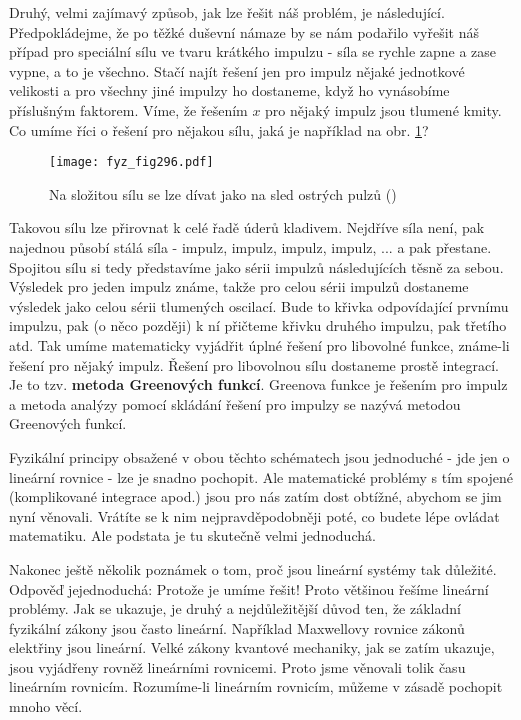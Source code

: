     Druhý, velmi zajímavý způsob, jak lze řešit náš problém, je následující. Předpokládejme, že po 
    těžké duševní námaze by se nám podařilo vyřešit náš případ pro speciální sílu ve tvaru krátkého 
    impulzu - síla se rychle zapne a zase vypne, a to je všechno. Stačí najít řešení jen pro impulz 
    nějaké jednotkové velikosti a pro všechny jiné impulzy ho dostaneme, když ho vynásobíme 
    příslušným faktorem. Víme, že řešením \(x\) pro nějaký impulz jsou tlumené kmity. Co umíme říci 
    o řešení pro nějakou sílu, jaká je například na obr. \ref{fyz:fig296}?

    \begin{figure}[ht!] %
      \centering
      \texttt{[image: fyz\_fig296.pdf]}
      \caption{Na složitou sílu se lze dívat jako na sled ostrých pulzů
               (\cite[s.~337]{Feynman01})}
      \label{fyz:fig296}
    \end{figure}
    
    Takovou sílu lze přirovnat k celé řadě úderů kladivem. Nejdříve síla není, pak najednou působí 
    stálá síla - impulz, impulz, impulz, impulz, ... a pak přestane. Spojitou sílu si tedy 
    představíme jako sérii impulzů následujících těsně za sebou. Výsledek pro jeden impulz známe, 
    takže pro celou sérii impulzů dostaneme výsledek jako celou sérii tlumených oscilací. Bude to 
    křivka odpovídající prvnímu impulzu, pak (o něco později) k ní přičteme křivku druhého impulzu, 
    pak třetího atd. Tak umíme matematicky vyjádřit úplné řešení pro libovolné funkce, známe-li 
    řešení pro nějaký impulz. Řešení pro libovolnou sílu dostaneme prostě integrací. Je to tzv. 
    \textbf{metoda Greenových funkcí}. Greenova funkce je řešením pro impulz a metoda analýzy 
    pomocí skládání řešení pro impulzy se nazývá metodou Greenových funkcí.
    
    Fyzikální principy obsažené v obou těchto schématech jsou jednoduché - jde jen o lineární 
    rovnice - lze je snadno pochopit. Ale matematické problémy s tím spojené (komplikované 
    integrace apod.) jsou pro nás zatím dost obtížné, abychom se jim nyní věnovali. Vrátíte se k 
    nim nejpravděpodobněji poté, co budete lépe ovládat matematiku. Ale podstata je tu skutečně 
    velmi jednoduchá.
    
    Nakonec ještě několik poznámek o tom, proč jsou lineární systémy tak důležité. Odpověď 
    jejednoduchá: Protože je umíme řešit! Proto většinou řešíme lineární problémy. Jak se ukazuje, 
    je druhý a nejdůležitější důvod ten, že základní fyzikální zákony jsou často lineární. 
    Například Maxwellovy rovnice zákonů elektřiny jsou lineární. Velké zákony kvantové mechaniky, 
    jak se zatím ukazuje, jsou vyjádřeny rovněž lineárními rovnicemi. Proto jsme věnovali tolik 
    času lineárním rovnicím. Rozumíme-li lineárním rovnicím, můžeme v zásadě pochopit mnoho věcí.
    
